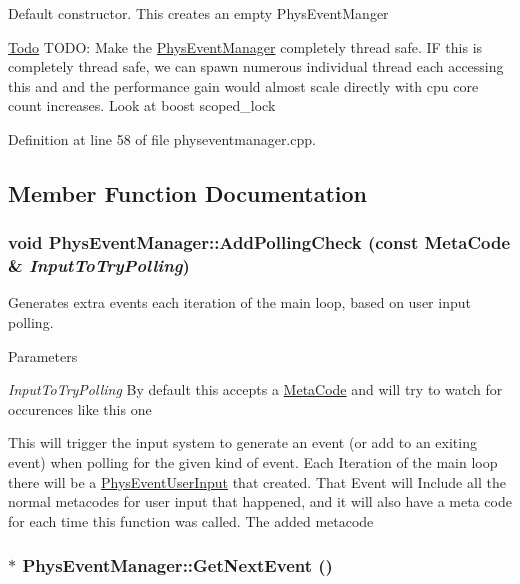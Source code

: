 Default constructor. This creates an empty PhysEventManger

\begin{Desc}
\item[\hyperlink{todo__todo000005}{Todo}]TODO: Make the \hyperlink{classPhysEventManager}{PhysEventManager} completely thread safe. IF this is completely thread safe, we can spawn numerous individual thread each accessing this and and the performance gain would almost scale directly with cpu core count increases. Look at boost scoped\_\-lock \end{Desc}


Definition at line 58 of file physeventmanager.cpp.

\subsection{Member Function Documentation}
\hypertarget{classPhysEventManager_a1e99385441c5377a741561db581ef3ae}{
\subsubsection[{AddPollingCheck}]{\setlength{\rightskip}{0pt plus 5cm}void PhysEventManager::AddPollingCheck (const {\bf MetaCode} \& {\em InputToTryPolling})}}
\label{d5/dd7/classPhysEventManager_a1e99385441c5377a741561db581ef3ae}


Generates extra events each iteration of the main loop, based on user input polling. 
\begin{DoxyParams}{Parameters}
\item[{\em InputToTryPolling}]By default this accepts a \hyperlink{classMetaCode}{MetaCode} and will try to watch for occurences like this one\end{DoxyParams}
This will trigger the input system to generate an event (or add to an exiting event) when polling for the given kind of event. Each Iteration of the main loop there will be a \hyperlink{classPhysEventUserInput}{PhysEventUserInput} that created. That Event will Include all the normal metacodes for user input that happened, and it will also have a meta code for each time this function was called. The added metacode \hypertarget{classPhysEventManager_a6de94bc6c23dcbd7e15785cadee2e80b}{
\subsubsection[{GetNextEvent}]{ $\ast$ PhysEventManager::GetNextEvent ()}}
\label{d5/dd7/classPhysEventManager_a6de94bc6c23dcbd7e15785cadee2e80b}


